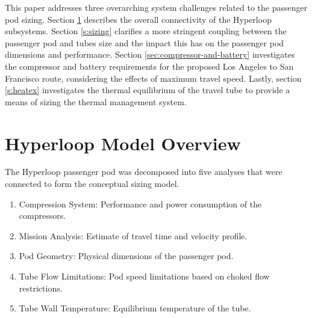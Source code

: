 \documentclass[heading.tex]{subfiles}
\begin{document}
This paper addresses three overarching system challenges related to the passenger pod sizing.
Section \ref{s:struct} describes the overall connectivity of the Hyperloop subsystems. 
Section \ref{s:sizing} clarifies a more stringent coupling between the passenger pod and tubes size
and the impact this has on the passenger pod dimensions and performance. 
Section \ref{sec:compressor-and-battery} investigates the compressor and battery requirements for the
proposed Los Angeles to San Francisco route, considering the effects of maximum travel speed. 
Lastly, section \ref{s:heatex} investigates the thermal equilibrium of the
travel tube to provide a means of sizing the thermal management system. 



\section{Hyperloop Model Overview}
\label{s:struct}

The Hyperloop passenger pod was decomposed into five analyses that were connected to 
form the conceptual sizing model. 

\begin{enumerate}
  \item Compression System: Performance and power consumption of the compressors.
  \item Mission Analysis: Estimate of travel time and velocity profile.
  \item Pod Geometry: Physical dimensions of the passenger pod.
  \item Tube Flow Limitations: Pod speed limitations based on choked flow restrictions.
  \item Tube Wall Temperature: Equilibrium temperature of the tube.
\end{enumerate}
\end{document}
